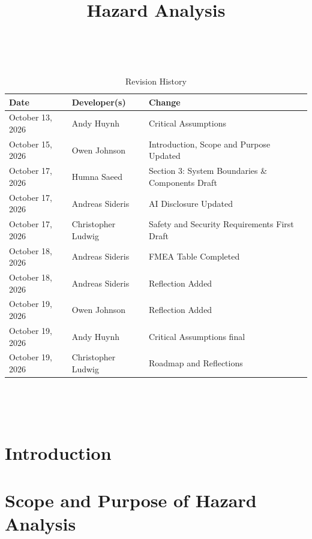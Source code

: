 \documentclass{article}
\title{Hazard Analysis\\\progname}
\author{\authname}
\date{}
\begin{document}
\maketitle
\thispagestyle{empty}

~\newpage


\begin{table}[hp]
\caption{Revision History} \label{TblRevisionHistory}
\begin{tabularx}{\textwidth}{llX}
\toprule
\textbf{Date} & \textbf{Developer(s)} & \textbf{Change}\\
\midrule
October 13, 2026 & Andy Huynh & Critical Assumptions\\
October 15, 2026 & Owen Johnson & Introduction, Scope and Purpose Updated\\
October 17, 2026 & Humna Saeed & Section 3: System Boundaries \& Components Draft \\
October 17, 2026 & Andreas Sideris & AI Disclosure Updated\\
October 17, 2026 & Christopher Ludwig & Safety and Security Requirements First Draft \\
October 18, 2026 & Andreas Sideris & FMEA Table Completed\\
October 18, 2026 & Andreas Sideris & Reflection Added\\
October 19, 2026 & Owen Johnson & Reflection Added\\
October 19, 2026 & Andy Huynh & Critical Assumptions final\\
October 19, 2026 & Christopher Ludwig & Roadmap and Reflections\\

\bottomrule
\end{tabularx}
\end{table}

~\newpage

\tableofcontents

\listoftables

~\newpage


\section{Introduction}



\section{Scope and Purpose of Hazard Analysis}
\end{document}

